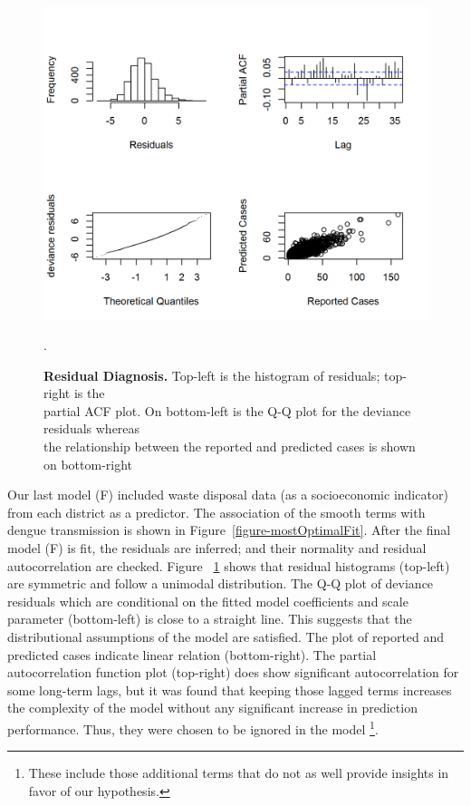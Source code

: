\documentclass{bmcart}
\begin{document}
\begin{figure}[h!]
	\begin{center}
		\includegraphics[width= 1.0\textwidth]{19-resid-diagnosis}
		\caption{\textbf{Residual Diagnosis.} Top-left is the histogram of residuals; top-right is the \\ partial ACF plot. On bottom-left is the Q-Q plot for the deviance residuals whereas \\ the relationship between the reported and predicted cases is shown on bottom-right}.
		\label{figure:resid-diagnosis}
	\end{center}
\end{figure}



Our last model (F) included waste disposal data (as a socioeconomic indicator) from each district as a predictor. The association of the smooth terms with dengue transmission is shown in Figure~\ref{figure-mostOptimalFit}. After the final model (F) is fit, the residuals are inferred; and their normality and residual autocorrelation are checked. Figure ~\ref{figure:resid-diagnosis} shows that residual histograms (top-left) are symmetric and follow a unimodal distribution. The Q-Q plot of deviance residuals which are conditional on the fitted model coefficients and scale parameter (bottom-left) is close to a straight line. This suggests that the distributional assumptions of the model are satisfied. The plot of reported and predicted cases indicate linear relation (bottom-right). The partial autocorrelation function plot (top-right) does show significant autocorrelation for some long-term lags, but it was found that keeping those lagged terms increases the complexity of the model without any significant increase in prediction performance. Thus, they were chosen to be ignored in the model \footnote{These include those additional terms that do not as well provide insights in favor of our hypothesis.}. 
\end{document}
